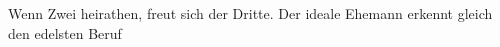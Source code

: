 Wenn Zwei heirathen, freut sich der Dritte. Der ideale Ehemann erkennt gleich den edelsten Beruf
\par

